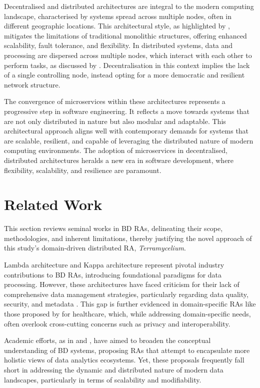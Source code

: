 \documentclass[preprint,12pt]{elsarticle}
\begin{document}
Decentralised and distributed architectures are integral to the modern computing landscape, characterised by systems spread across multiple nodes, often in different geographic locations. This architectural style, as highlighted by \citet{Richards2015}, mitigates the limitations of traditional monolithic structures, offering enhanced scalability, fault tolerance, and flexibility. In distributed systems, data and processing are dispersed across multiple nodes, which interact with each other to perform tasks, as discussed by \citet{Coulouris2005}. Decentralisation in this context implies the lack of a single controlling node, instead opting for a more democratic and resilient network structure.

The convergence of microservices within these architectures represents a progressive step in software engineering. It reflects a move towards systems that are not only distributed in nature but also modular and adaptable. This architectural approach aligns well with contemporary demands for systems that are scalable, resilient, and capable of leveraging the distributed nature of modern computing environments. The adoption of microservices in decentralised, distributed architectures heralds a new era in software development, where flexibility, scalability, and resilience are paramount.




\section{Related Work}
\label{sec:related_work}

This section reviews seminal works in BD RAs, delineating their scope, methodologies, and inherent limitations, thereby justifying the novel approach of this study's domain-driven distributed RA, \textit{Terramycelium}.

Lambda architecture \cite{kiran2015lambda} and Kappa architecture \cite{kreps2014questioning} represent pivotal industry contributions to BD RAs, introducing foundational paradigms for data processing. However, these architectures have faced criticism for their lack of comprehensive data management strategies, particularly regarding data quality, security, and metadata \cite{AtaeiACIS}. This gap is further evidenced in domain-specific RAs like those proposed by \cite{quintero2019ibm} for healthcare, which, while addressing domain-specific needs, often overlook cross-cutting concerns such as privacy and interoperability.

Academic efforts, as in \cite{viana2014proposal} and \cite{paakkonen2015reference}, have aimed to broaden the conceptual understanding of BD systems, proposing RAs that attempt to encapsulate more holistic views of data analytics ecosystems. Yet, these proposals frequently fall short in addressing the dynamic and distributed nature of modern data landscapes, particularly in terms of scalability and modifiability.
\end{document}
